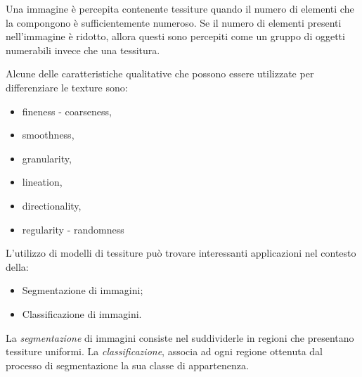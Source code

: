 Una immagine è percepita contenente tessiture quando il numero di elementi che la compongono è sufficientemente numeroso.
Se il numero di elementi presenti nell'immagine è ridotto, allora questi sono percepiti come un gruppo di oggetti numerabili invece che una tessitura\cite{SlidePala}.

Alcune delle caratteristiche qualitative che possono essere utilizzate per differenziare le texture sono:

\begin{itemize}
\item fineness - coarseness,
\item smoothness,
\item granularity,
\item lineation,
\item directionality,
\item regularity - randomness
\end{itemize}

\noindent L'utilizzo di modelli di tessiture può trovare interessanti applicazioni nel contesto della:

\begin{itemize}
\item Segmentazione di immagini;
\item Classificazione di immagini.
\end{itemize}

La \textit{segmentazione} di immagini consiste nel suddividerle in regioni che presentano tessiture uniformi. La \textit{classificazione}, associa ad ogni regione ottenuta dal processo di segmentazione la sua classe di appartenenza.